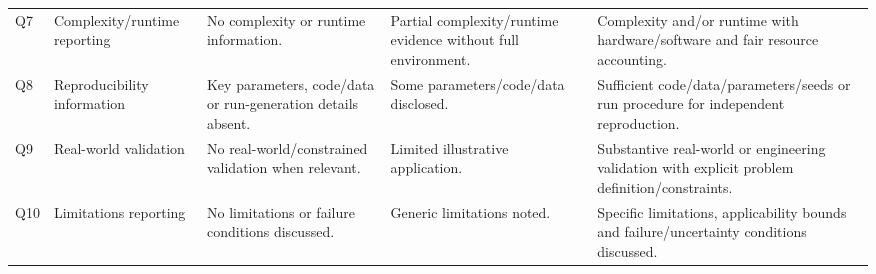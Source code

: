 \documentclass[8pt]{article}
\begin{document}
\begin{longtable}{P{1.0cm}P{4.2cm}P{3.6cm}P{3.6cm}P{3.6cm}}
Q7 & Complexity/runtime reporting & No complexity or runtime information. & Partial complexity/runtime evidence without full environment. & Complexity and/or runtime with hardware/software and fair resource accounting.\\
Q8 & Reproducibility information & Key parameters, code/data or run-generation details absent. & Some parameters/code/data disclosed. & Sufficient code/data/parameters/seeds or run procedure for independent reproduction.\\
Q9 & Real-world validation & No real-world/constrained validation when relevant. & Limited illustrative application. & Substantive real-world or engineering validation with explicit problem definition/constraints.\\
Q10 & Limitations reporting & No limitations or failure conditions discussed. & Generic limitations noted. & Specific limitations, applicability bounds and failure/uncertainty conditions discussed.\\
\bottomrule\end{longtable}
\end{document}
